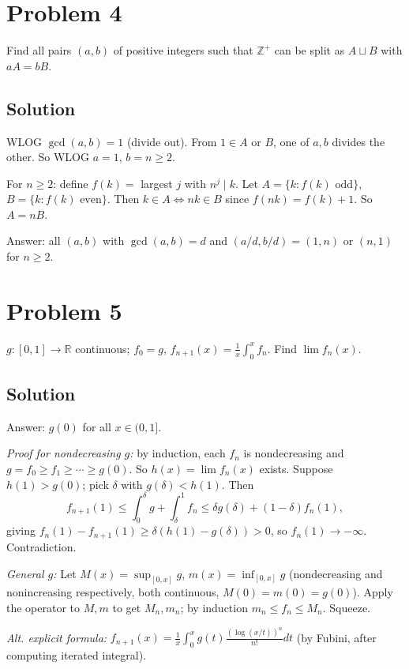 \documentclass{article}
\begin{document}
\section*{Problem 4}
Find all pairs $(a, b)$ of positive integers such that $\mathbb{Z}^+$ can be split as $A \sqcup B$ with $a A = b B$.

\subsection*{Solution}
WLOG $\gcd(a, b) = 1$ (divide out). From $1 \in A$ or $B$, one of $a, b$ divides the other. So WLOG $a = 1$, $b = n \ge 2$.

For $n \ge 2$: define $f(k) = $ largest $j$ with $n^j \mid k$. Let $A = \{k : f(k) \text{ odd}\}$, $B = \{k : f(k) \text{ even}\}$. Then $k \in A \iff nk \in B$ since $f(nk) = f(k) + 1$. So $A = n B$.

Answer: all $(a, b)$ with $\gcd(a, b) = d$ and $(a/d, b/d) = (1, n)$ or $(n, 1)$ for $n \ge 2$.

\section*{Problem 5}
$g : [0,1] \to \mathbb{R}$ continuous; $f_0 = g$, $f_{n+1}(x) = \tfrac{1}{x}\int_0^x f_n$. Find $\lim f_n(x)$.

\subsection*{Solution}
Answer: $g(0)$ for all $x \in (0, 1]$.

\emph{Proof for nondecreasing $g$:} by induction, each $f_n$ is nondecreasing and $g = f_0 \ge f_1 \ge \cdots \ge g(0)$. So $h(x) = \lim f_n(x)$ exists. Suppose $h(1) > g(0)$; pick $\delta$ with $g(\delta) < h(1)$. Then
\[
f_{n+1}(1) \le \int_0^\delta g + \int_\delta^1 f_n \le \delta g(\delta) + (1 - \delta) f_n(1),
\]
giving $f_n(1) - f_{n+1}(1) \ge \delta(h(1) - g(\delta)) > 0$, so $f_n(1) \to -\infty$. Contradiction.

\emph{General $g$:} Let $M(x) = \sup_{[0,x]} g$, $m(x) = \inf_{[0,x]} g$ (nondecreasing and nonincreasing respectively, both continuous, $M(0) = m(0) = g(0)$). Apply the operator to $M, m$ to get $M_n, m_n$; by induction $m_n \le f_n \le M_n$. Squeeze.

\emph{Alt. explicit formula:} $f_{n+1}(x) = \tfrac{1}{x} \int_0^x g(t) \tfrac{(\log(x/t))^n}{n!} dt$ (by Fubini, after computing iterated integral).
\end{document}
